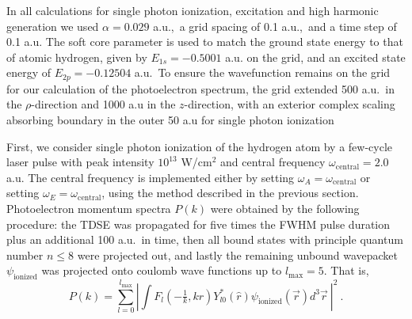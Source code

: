 In all calculations for single photon ionization, excitation and high harmonic generation we used $\alpha=0.029$ a.u.,\ a grid spacing of 0.1 a.u.,\ and a time step of 0.1 a.u. The soft core parameter is used to match the ground state energy to that of atomic hydrogen, given by $E_{1s} = -0.5001$ a.u. on the grid, and an excited state energy of $E_{2p} = -0.12504$ a.u.\  To ensure the wavefunction remains on the grid for our calculation of the photoelectron spectrum, the grid extended 500 a.u.\  in the $\rho$-direction and 1000 a.u in the $z$-direction, with an exterior complex scaling absorbing boundary in the outer 50 a.u for single photon ionization

First, we consider single photon ionization of the hydrogen atom by a few-cycle laser pulse with peak intensity $10^{13}$ W/cm$^2$ and central frequency $\omega_{\text{central}} = 2.0$ a.u. The central frequency is implemented either by setting $\omega_A=\omega_{\text{central}}$ or setting $\omega_E=\omega_{\text{central}}$, using the method described in the previous section. Photoelectron momentum spectra $P(k)$ were obtained by the following procedure: the TDSE was propagated for five times the FWHM pulse duration plus an additional 100 a.u.\  in time, then all bound states with principle quantum number $n\le 8$ were projected out, and lastly the remaining unbound wavepacket $\psi_{\text{ionized}}$ was projected onto coulomb wave functions up to $l_{\text{max}}=5$. That is,
%
\begin{equation}
P(k) = \sum_{l=0}^{l_{\text{max}}} \left|\int F_{l}(-\tfrac{1}{k}, kr)Y^*_{l0}(\hat{r})\psi_{\text{ionized}}(\vec{r})d^{3}\vec{r}~\right|^2 ~.
\end{equation}


